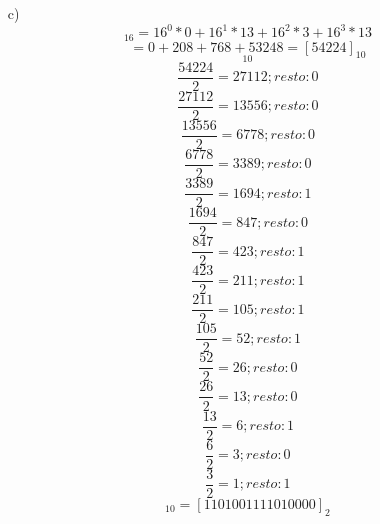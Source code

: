 \documentclass{article}
\begin{document}
\begin{enumerate}
    \item[c)] \begin{equation*} [D3D0]_{16} = 16^{0} * 0 + 16^{1} * 13 + 16^{2} * 3 + 16^{3} * 13\end{equation*} \begin{equation*} = 0 + 208 + 768 + 53248 = [54224]_{10}\end{equation*} \begin{equation*}[54224]_{10}\end{equation*}\begin{equation*} \frac{54224}{2} =  27112;  resto: 0\end{equation*}\begin{equation*} \frac{27112}{2} =  13556;  resto: 0\end{equation*}\begin{equation*} \frac{13556}{2} =  6778;  resto: 0\end{equation*}\begin{equation*} \frac{6778}{2} =  3389;  resto: 0\end{equation*}\begin{equation*} \frac{3389}{2} =  1694;  resto: 1\end{equation*}\begin{equation*} \frac{1694}{2} =  847;  resto: 0\end{equation*}\begin{equation*} \frac{847}{2} =  423;  resto: 1\end{equation*}\begin{equation*} \frac{423}{2} =  211;  resto: 1\end{equation*}\begin{equation*} \frac{211}{2} =  105;  resto: 1\end{equation*}\begin{equation*} \frac{105}{2} =  52;  resto: 1\end{equation*}\begin{equation*} \frac{52}{2} =  26;  resto: 0\end{equation*}\begin{equation*} \frac{26}{2} =  13;  resto: 0\end{equation*}\begin{equation*} \frac{13}{2} =  6;  resto: 1\end{equation*}\begin{equation*} \frac{6}{2} =  3;  resto: 0\end{equation*}\begin{equation*} \frac{3}{2} =  1;  resto: 1\end{equation*}\begin{equation*}[54224]_{10} = [1101001111010000]_{2}\end{equation*}

\end{enumerate}
\end{document}

